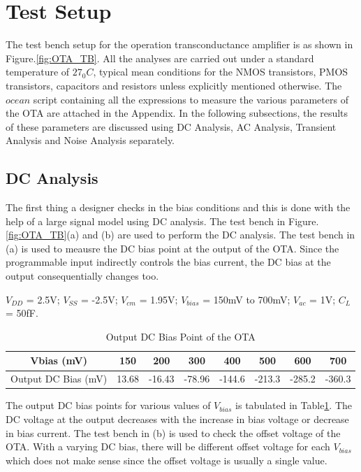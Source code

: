 \section{Test Setup}
The test bench setup for the operation transconductance amplifier is as shown in Figure.\ref{fig:OTA_TB}. All the analyses are carried out under a standard temperature of $27_0C$, typical mean conditions for the NMOS transistors, PMOS transistors, capacitors and resistors unless explicitly mentioned otherwise. The $ocean$ script containing all the expressions to measure the various parameters of the OTA are attached in the Appendix. In the following subsections, the results of these parameters are discussed using DC Analysis, AC Analysis, Transient Analysis and Noise Analysis separately.

\subsection{DC Analysis}
The first thing a designer checks in the bias conditions and this is done with the help of a large signal model using DC analysis. The test bench in Figure.\ref{fig:OTA_TB}(a) and (b) are used to perform the DC analysis. The test bench in (a) is used to meausre the DC bias point at the output of the OTA. Since the programmable input indirectly controls the bias current, the DC bias at the output consequentially changes too.
 
$V_{DD}$ = 2.5V; $V_{SS}$ = -2.5V; $V_{cm}$ = 1.95V; $V_{bias}$ = 150mV to 700mV;  $V_{ac}$ = 1V; $C_{L}$ = 50fF.

\begin{table} [H]
\centering
\begin{tabular}{@{}cccccccc@{}}
\toprule
Vbias (mV)					& 150		& 200			& 300			& 400			& 500			& 600			& 700 \\ \midrule
Output DC Bias (mV)			& 13.68		& -16.43		& -78.96		& -144.6		& -213.3		& -285.2		& -360.3 \\
\bottomrule
\end{tabular}
\caption{Output DC Bias Point of the OTA}
\label{tab:OTA_DC_Bias}
\end{table}

The output DC bias points for various values of $V_{bias}$ is tabulated in Table\ref{tab:OTA_DC_Bias}. The DC voltage at the output decreases with the increase in bias voltage or decrease in bias current. The test bench in (b) is used to check the offset voltage of the OTA. With a varying DC bias, there will be different offset voltage for each $V_{bias}$ which does not make sense since the offset voltage is usually a single value.

